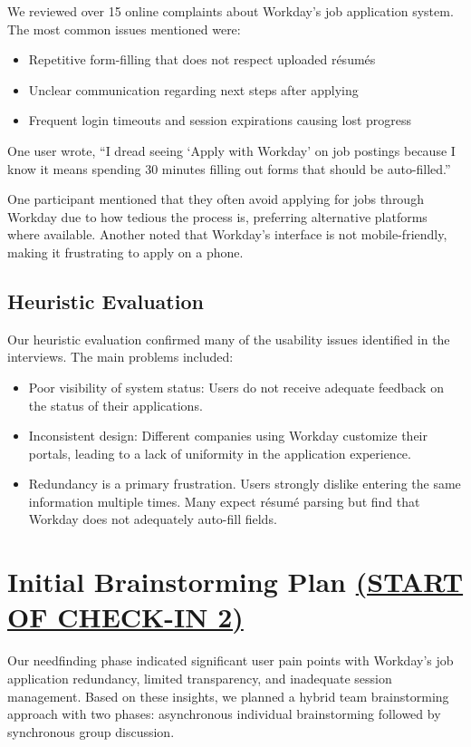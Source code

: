\documentclass[
	letterpaper, %
]{jdf}
\begin{document}
\begin{sloppypar}
We reviewed over 15 online complaints about Workday’s job application system. The most common issues mentioned were:
\begin{itemize}
\item Repetitive form-filling that does not respect uploaded résumés
\item Unclear communication regarding next steps after applying
\item Frequent login timeouts and session expirations causing lost progress
\end{itemize}

One user wrote, “I dread seeing ‘Apply with Workday’ on job postings because I know it means spending 30 minutes filling out forms that should be auto-filled.”

One participant mentioned that they often avoid applying for jobs through Workday due to how tedious the process is, preferring alternative platforms where available. Another noted that Workday’s interface is not mobile-friendly, making it frustrating to apply on a phone.
\hfill \break

\subsection{Heuristic Evaluation}
Our heuristic evaluation confirmed many of the usability issues identified in the interviews. The main problems included:
\begin{itemize}
\item Poor visibility of system status: Users do not receive adequate feedback on the status of their applications.
\item Inconsistent design: Different companies using Workday customize their portals, leading to a lack of uniformity in the application experience.
\item Redundancy is a primary frustration. Users strongly dislike entering the same information multiple times. Many expect résumé parsing but find that Workday does not adequately auto-fill fields.
\end{itemize}


\newpage

\section{Initial Brainstorming Plan \underline{(START OF CHECK-IN 2)}}
Our needfinding phase indicated significant user pain points with Workday's job application redundancy, limited transparency, and inadequate session management. Based on these insights, we planned a hybrid team brainstorming approach with two phases: asynchronous individual brainstorming followed by synchronous group discussion.


\end{sloppypar}
\end{document}
